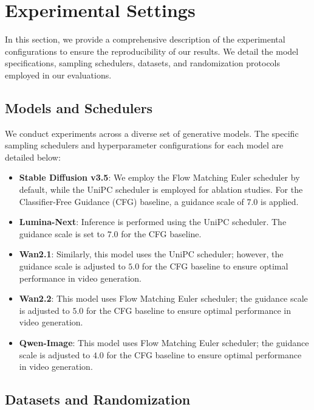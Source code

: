 \section{Experimental Settings}

In this section, we provide a comprehensive description of the experimental configurations to ensure the reproducibility of our results. We detail the model specifications, sampling schedulers, datasets, and randomization protocols employed in our evaluations.

\subsection{Models and Schedulers}
\label{app:models_schedulers}

We conduct experiments across a diverse set of generative models. The specific sampling schedulers and hyperparameter configurations for each model are detailed below:

\begin{itemize}
    \item \textbf{Stable Diffusion v3.5}:
    We employ the Flow Matching Euler scheduler by default, while the UniPC scheduler is employed for ablation studies. For the Classifier-Free Guidance (CFG) baseline, a guidance scale of $7.0$ is applied.

    \item \textbf{Lumina-Next}:
    Inference is performed using the UniPC scheduler. The guidance scale is set to $7.0$ for the CFG baseline.

    \item \textbf{Wan2.1}:
    Similarly, this model uses the UniPC scheduler; however, the guidance scale is adjusted to $5.0$ for the CFG baseline to ensure optimal performance in video generation.

    \item \textbf{Wan2.2}: This model uses Flow Matching Euler scheduler; the guidance scale is adjusted to $5.0$ for the CFG baseline to ensure optimal performance in video generation.

    \item \textbf{Qwen-Image}: This model uses Flow Matching Euler scheduler; the guidance scale is adjusted to $4.0$ for the CFG baseline to ensure optimal performance in video generation.
    
\end{itemize}

\subsection{Datasets and Randomization}
\label{app:datasets}

